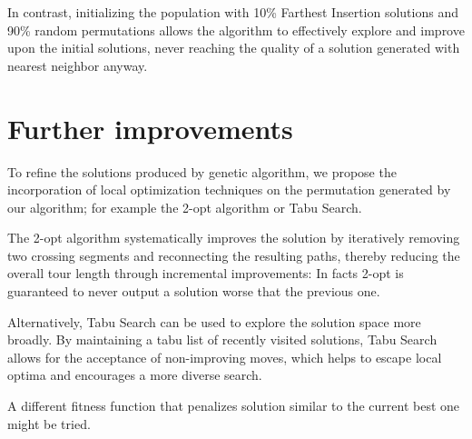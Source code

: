 \documentclass[11pt,letterpaper]{article}
\begin{document}
In contrast, initializing the population with 10\% Farthest Insertion solutions and 90\% random permutations allows the algorithm to effectively explore and improve upon the initial solutions, never reaching the quality of a solution generated with nearest neighbor anyway.


\section{Further improvements}

To refine the solutions produced by genetic algorithm, we propose the incorporation of local optimization techniques on the permutation generated by our algorithm; for example the 2-opt algorithm or Tabu Search.

The 2-opt algorithm systematically improves the solution by iteratively removing two crossing segments and reconnecting the resulting paths, thereby reducing the overall tour length through incremental improvements: In facts 2-opt is guaranteed to never output a solution worse that the previous one.

Alternatively, Tabu Search can be used to explore the solution space more broadly. By maintaining a tabu list of recently visited solutions, Tabu Search allows for the acceptance of non-improving moves, which helps to escape local optima and encourages a more diverse search.

A different fitness function that penalizes solution similar to the current best one might be tried.


\printbibliography
\end{document}
